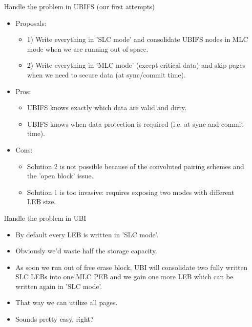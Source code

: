 \documentclass[aspectratio=169,obeyspaces,spaces,hyphens,dvipsnames]{beamer}
\begin{document}
\begin{frame}{Handle the problem in UBIFS (our first attempts)}
  \begin{itemize}
  \item Proposals:
    \begin{itemize}
    \item 1) Write everything in 'SLC mode' and consolidate UBIFS nodes in MLC
	  mode when we are running out of space.
    \item 2) Write everything in 'MLC mode' (except critical data) and skip
	  pages when we need to secure data (at sync/commit time).
    \end{itemize}
  \item Pros:
    \begin{itemize}
    \item UBIFS knows exactly which data are valid and dirty.
    \item UBIFS knows when data protection is required (i.e. at sync and commit
	  time).
    \end{itemize}
  \item Cons:
    \begin{itemize}
    \item Solution 2 is not possible because of the convoluted pairing schemes
	  and the 'open block' issue.
    \item Solution 1 is too invasive: requires exposing two modes with different
	  LEB size.
    \end{itemize}
  \end{itemize}
\end{frame}

\begin{frame}{Handle the problem in UBI}
  \begin{itemize}
  \item By default every LEB is written in 'SLC mode'.
  \item Obviously we'd waste half the storage capacity.
  \item As soon we run out of free erase block, UBI will consolidate
	two fully written SLC LEBs into one MLC PEB and we gain one
	more LEB which can be written again in 'SLC mode'.
  \item That way we can utilize all pages.
  \item Sounds pretty easy, right?
  \end{itemize}
\end{frame}
\end{document}
